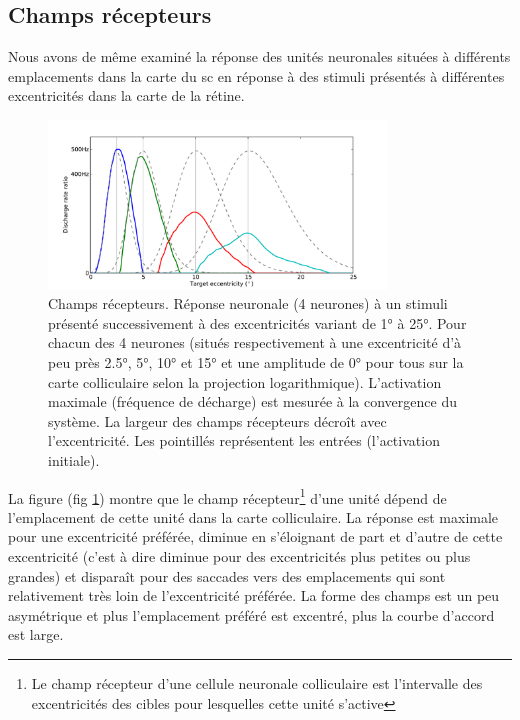 \subsection{Champs récepteurs}

Nous avons de même examiné la réponse des unités neuronales situées à différents emplacements dans la carte du \gls{sc} en réponse à des stimuli présentés à différentes excentricités dans la carte de la rétine. \\

\begin{figure}[ht]
  \begin{center}
    \includegraphics[width=0.8\textwidth]{figures/ch3_5_RF}
  \end{center}
  \caption{ Champs récepteurs. Réponse neuronale (4 neurones) à un stimuli présenté successivement à des excentricités variant de 1° à 25°. Pour chacun des 4 neurones (situés respectivement à une excentricité d'à peu près 2.5°, 5°, 10° et 15° et une amplitude de 0° pour tous sur la carte colliculaire selon la projection logarithmique). L'activation maximale (fréquence de décharge) est mesurée à la convergence du système. La largeur des champs récepteurs décroît avec l'excentricité. Les pointillés représentent les entrées (l'activation initiale).}
  \label{fig: receptive-field}
\end{figure}

La figure (fig \ref{fig: receptive-field}) montre que le champ récepteur\footnote{Le champ récepteur d'une cellule neuronale colliculaire est l'intervalle des excentricités des cibles pour lesquelles cette unité s'active} d'une unité dépend de l'emplacement de cette unité dans la carte colliculaire. La réponse est maximale pour une excentricité préférée, diminue en s'éloignant de part et d'autre de cette excentricité (c'est à dire diminue pour des excentricités plus petites ou plus grandes) et disparaît pour des saccades vers des emplacements qui sont relativement très loin de l'excentricité préférée. La forme des champs est un peu asymétrique et plus l'emplacement préféré est excentré, plus la courbe d'accord est large.

